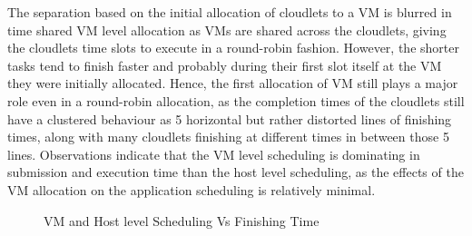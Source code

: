 \documentclass[times, 10pt,twocolumn]{article}
\begin{document}
The separation based on the initial allocation of cloudlets to a VM is blurred in time shared VM level allocation as VMs are shared across the cloudlets, giving the cloudlets time slots to execute in a round-robin fashion. However, the shorter tasks tend to finish faster and probably during their first slot itself at the VM they were initially allocated. Hence, the first allocation of VM still plays a major role even in a round-robin allocation, as the completion times of the cloudlets still have a clustered behaviour as 5 horizontal but rather distorted lines of finishing times, along with many cloudlets finishing at different times in between those 5 lines. Observations indicate that the VM level scheduling is dominating in submission and execution time than the host level scheduling, as the effects of the VM allocation on the application scheduling is relatively minimal.
\begin{figure}[ht]
 \caption{VM and Host level Scheduling Vs Finishing Time}
 \label{fig:finish}
\end{figure}
\end{document}
